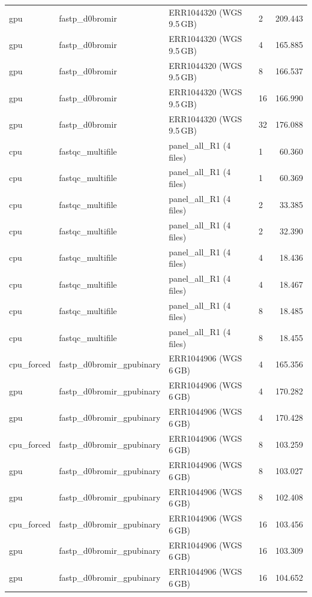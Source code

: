 \documentclass[a4paper,12pt]{article}
\begin{document}
\begin{longtable}{llllr}
  gpu & fastp\_d0bromir & ERR1044320 (WGS 9.5\,GB) & 2  & 209.443 \\
  gpu & fastp\_d0bromir & ERR1044320 (WGS 9.5\,GB) & 4  & 165.885 \\
  gpu & fastp\_d0bromir & ERR1044320 (WGS 9.5\,GB) & 8  & 166.537 \\
  gpu & fastp\_d0bromir & ERR1044320 (WGS 9.5\,GB) & 16 & 166.990 \\
  gpu & fastp\_d0bromir & ERR1044320 (WGS 9.5\,GB) & 32 & 176.088 \\
  cpu & fastqc\_multifile & panel\_all\_R1 (4 files) & 1 & 60.360 \\
  cpu & fastqc\_multifile & panel\_all\_R1 (4 files) & 1 & 60.369 \\
  cpu & fastqc\_multifile & panel\_all\_R1 (4 files) & 2 & 33.385 \\
  cpu & fastqc\_multifile & panel\_all\_R1 (4 files) & 2 & 32.390 \\
  cpu & fastqc\_multifile & panel\_all\_R1 (4 files) & 4 & 18.436 \\
  cpu & fastqc\_multifile & panel\_all\_R1 (4 files) & 4 & 18.467 \\
  cpu & fastqc\_multifile & panel\_all\_R1 (4 files) & 8 & 18.485 \\
  cpu & fastqc\_multifile & panel\_all\_R1 (4 files) & 8 & 18.455 \\
  cpu\_forced & fastp\_d0bromir\_gpubinary & ERR1044906 (WGS 6\,GB) & 4  & 165.356 \\
  gpu         & fastp\_d0bromir\_gpubinary & ERR1044906 (WGS 6\,GB) & 4  & 170.282 \\
  gpu         & fastp\_d0bromir\_gpubinary & ERR1044906 (WGS 6\,GB) & 4  & 170.428 \\
  cpu\_forced & fastp\_d0bromir\_gpubinary & ERR1044906 (WGS 6\,GB) & 8  & 103.259 \\
  gpu         & fastp\_d0bromir\_gpubinary & ERR1044906 (WGS 6\,GB) & 8  & 103.027 \\
  gpu         & fastp\_d0bromir\_gpubinary & ERR1044906 (WGS 6\,GB) & 8  & 102.408 \\
  cpu\_forced & fastp\_d0bromir\_gpubinary & ERR1044906 (WGS 6\,GB) & 16 & 103.456 \\
  gpu         & fastp\_d0bromir\_gpubinary & ERR1044906 (WGS 6\,GB) & 16 & 103.309 \\
  gpu         & fastp\_d0bromir\_gpubinary & ERR1044906 (WGS 6\,GB) & 16 & 104.652 \\
\end{longtable}
\end{document}

